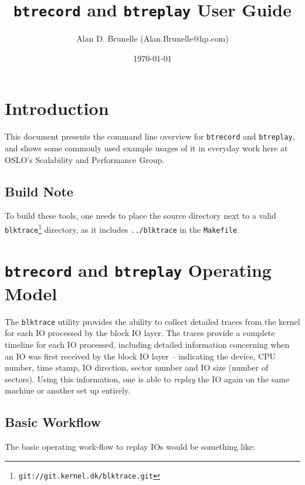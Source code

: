 \documentclass{article}
\begin{document}
\title{\texttt{btrecord} and \texttt{btreplay} User Guide}
\author{Alan D. Brunelle (Alan.Brunelle@hp.com)}
\date{\today}
\maketitle
\begin{abstract}

\end{abstract}
\thispagestyle{empty}\newpage
\tableofcontents\thispagestyle{empty}\newpage
\section{Introduction}


\bigskip 
This document presents the command line overview for
\texttt{btrecord} and \texttt{btreplay}, and shows some commonly used
example usages of it in everyday work here at OSLO's Scalability and
Performance Group.

\subsection*{Build Note}

To build these tools, one needs to
place the source directory next to a valid
\texttt{blktrace}\footnote{\texttt{git://git.kernel.dk/blktrace.git}}
directory, as it includes \texttt{../blktrace} in the \texttt{Makefile}.


\newpage\section{\texttt{btrecord} and \texttt{btreplay} Operating Model}

The \texttt{blktrace} utility provides the ability to collect detailed
traces from the kernel for each IO processed by the block IO layer. The
traces provide a complete timeline for each IO processed, including
detailed information concerning when an IO was first received by the block
IO layer -- indicating the device, CPU number, time stamp, IO direction,
sector number and IO size (number of sectors). Using this information,
one is able to \emph{replay} the IO again on the same machine or another
set up entirely.

\subsection{Basic Workflow}
The basic operating work-flow to replay IOs would be something like:
\end{document}
